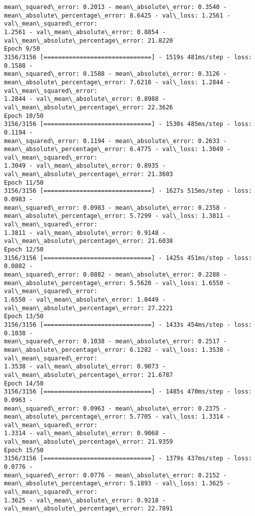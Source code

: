 \documentclass[11pt]{article}
\begin{document}
\begin{Verbatim}[commandchars=\\\{\},fontsize=\footnotesize]
mean\_squared\_error: 0.2013 - mean\_absolute\_error: 0.3540 -
mean\_absolute\_percentage\_error: 8.6425 - val\_loss: 1.2561 - val\_mean\_squared\_error:
1.2561 - val\_mean\_absolute\_error: 0.8854 - val\_mean\_absolute\_percentage\_error: 21.8220
Epoch 9/50
3156/3156 [==============================] - 1519s 481ms/step - loss: 0.1588 -
mean\_squared\_error: 0.1588 - mean\_absolute\_error: 0.3126 -
mean\_absolute\_percentage\_error: 7.6218 - val\_loss: 1.2844 - val\_mean\_squared\_error:
1.2844 - val\_mean\_absolute\_error: 0.8988 - val\_mean\_absolute\_percentage\_error: 22.3626
Epoch 10/50
3156/3156 [==============================] - 1530s 485ms/step - loss: 0.1194 -
mean\_squared\_error: 0.1194 - mean\_absolute\_error: 0.2633 -
mean\_absolute\_percentage\_error: 6.4775 - val\_loss: 1.3049 - val\_mean\_squared\_error:
1.3049 - val\_mean\_absolute\_error: 0.8935 - val\_mean\_absolute\_percentage\_error: 21.3603
Epoch 11/50
3156/3156 [==============================] - 1627s 515ms/step - loss: 0.0983 -
mean\_squared\_error: 0.0983 - mean\_absolute\_error: 0.2358 -
mean\_absolute\_percentage\_error: 5.7299 - val\_loss: 1.3811 - val\_mean\_squared\_error:
1.3811 - val\_mean\_absolute\_error: 0.9148 - val\_mean\_absolute\_percentage\_error: 21.6038
Epoch 12/50
3156/3156 [==============================] - 1425s 451ms/step - loss: 0.0882 -
mean\_squared\_error: 0.0882 - mean\_absolute\_error: 0.2288 -
mean\_absolute\_percentage\_error: 5.5620 - val\_loss: 1.6550 - val\_mean\_squared\_error:
1.6550 - val\_mean\_absolute\_error: 1.0449 - val\_mean\_absolute\_percentage\_error: 27.2221
Epoch 13/50
3156/3156 [==============================] - 1433s 454ms/step - loss: 0.1038 -
mean\_squared\_error: 0.1038 - mean\_absolute\_error: 0.2517 -
mean\_absolute\_percentage\_error: 6.1282 - val\_loss: 1.3538 - val\_mean\_squared\_error:
1.3538 - val\_mean\_absolute\_error: 0.9073 - val\_mean\_absolute\_percentage\_error: 21.6787
Epoch 14/50
3156/3156 [==============================] - 1485s 470ms/step - loss: 0.0963 -
mean\_squared\_error: 0.0963 - mean\_absolute\_error: 0.2375 -
mean\_absolute\_percentage\_error: 5.7705 - val\_loss: 1.3314 - val\_mean\_squared\_error:
1.3314 - val\_mean\_absolute\_error: 0.9068 - val\_mean\_absolute\_percentage\_error: 21.9359
Epoch 15/50
3156/3156 [==============================] - 1379s 437ms/step - loss: 0.0776 -
mean\_squared\_error: 0.0776 - mean\_absolute\_error: 0.2152 -
mean\_absolute\_percentage\_error: 5.1893 - val\_loss: 1.3625 - val\_mean\_squared\_error:
1.3625 - val\_mean\_absolute\_error: 0.9218 - val\_mean\_absolute\_percentage\_error: 22.7891

\end{Verbatim}
\end{document}

